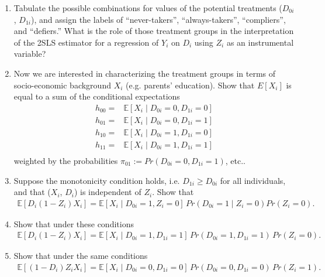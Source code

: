 \documentclass[11pt]{article}
\begin{document}
\bigskip
\begin{enumerate}[label=\alph*)]

    \item Tabulate the possible combinations for values of the potential treatments ($D_{0i}$, $D_{1i}$), and assign the labels of ``never-takers'', ``always-takers'', ``compliers'', and ``defiers.'' What is the role of those treatment groups in the interpretation of the 2SLS estimator for a regression of $Y_i$ on $D_i$ using $Z_i$ as an instrumental variable?

    \item Now we are interested in characterizing the treatment groups in terms of socio-economic background $X_i$ (e.g. parents’ education). Show that $E[X_i]$ is equal to a sum of the conditional expectations 
    \[
    \begin{array}{cl}
    h_{00} =& \mathbb{E}[X_i \mid D_{0i} = 0, D_{1i} = 0] \\
    h_{01} =& \mathbb{E}[X_i \mid D_{0i} = 0, D_{1i} = 1] \\
    h_{10} =& \mathbb{E}[X_i \mid D_{0i} = 1, D_{1i} = 0] \\
    h_{11} =& \mathbb{E}[X_i \mid D_{0i} = 1, D_{1i} = 1] \\
    \end{array}
    \]
     weighted by the probabilities $\pi_{01} := Pr(D_{0i} = 0, D_{1i} = 1)$, etc..

    \item Suppose the monotonicity condition holds, i.e. $D_{1i} \geq D_{0i}$ for all individuals, and that ($X_i$, $D_i$) is independent of $Z_i$. Show that 
    \begin{align*}
        \mathbb{E}[D_i(1 - Z_i)X_i] = \mathbb{E}[X_i \mid D_{0i} = 1, Z_i = 0] \,Pr(D_{0i} = 1 \mid Z_i = 0) Pr(Z_i = 0).
    \end{align*}

    \item Show that under these conditions 
    \begin{align*}
        \mathbb{E}[D_i(1 - Z_i)X_i] = \mathbb{E}[X_i \mid D_{0i} = 1, D_{1i} =1]\, Pr(D_{0i} = 1, D_{1i} = 1)\, Pr(Z_i = 0).
    \end{align*}

    \item Show that under the same conditions 
    \begin{align*}
        \mathbb{E}[(1 - D_i)Z_i X_i] = \mathbb{E}[X_i \mid D_{0i} = 0, D_{1i}= 0]\, Pr(D_{0i} = 0, D_{1i} = 0)\, Pr(Z_i = 1).
    \end{align*}


\end{enumerate}
\end{document}
